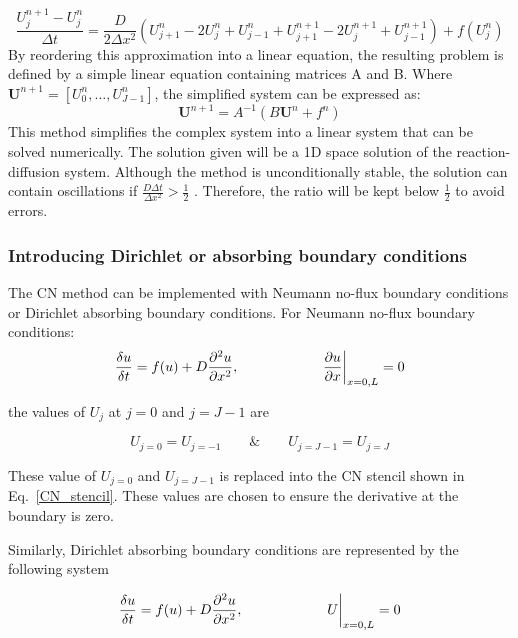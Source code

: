 \begin{equation}
    \frac{U^{n+1}_{j} - U^{n}_{j}}{\Delta t} = \frac{D}{2\Delta x^{2}}\left( U^{n}_{j+1} -  2U^{n}_{j} + U^{n}_{j-1} + U^{n+1}_{j+1} - 2U^{n+1}_{j} + U^{n+1}_{j-1}\right) +  f( U^{n}_{j})
    \label{CN_stencil}
\end{equation}
By reordering this approximation into a linear equation, the resulting problem is defined by a simple linear equation containing matrices A and B. Where $\textbf{U}^{n+1} = [U^{n}_{0}, \ldots , U^{n}_{J-1}]$, the simplified system can be expressed as:
\begin{equation}
    \textbf{U}^{n+1} = A^{-1}(B\textbf{U}^{n} + f^{n})
\end{equation}
This method simplifies the complex system into a linear system that can be solved numerically. The solution given will be a 1D space solution of the reaction-diffusion system. Although the method is unconditionally stable, the solution can contain oscillations if $ \frac{D\Delta t}{\Delta x^{2}} >\frac{1}{2} $ \parencite{trefethen1996finite}. Therefore, the ratio will be kept below $\frac{1}{2}$ to avoid errors.

\subsubsection{Introducing Dirichlet or absorbing boundary conditions}\label{methods_boundary_conditions_CN}
The CN method can be implemented with Neumann no-flux boundary conditions or Dirichlet absorbing boundary conditions.
For Neumann no-flux boundary conditions:
\begin{equation}
    \frac{\delta u}{\delta t} =  f(u) + D\frac{\partial^{2} {u}}{\partial {x}^{2}},   \quad \quad \quad \quad \quad \quad \pdv{u}{x}\biggr\rvert_{x=0,L}=0
\end{equation}

the values of $U_{j}$ at $j=0$ and $j=J-1$ are

\begin{equation}
    U_{j=0} = U_{j=-1}  \quad \quad \&  \quad \quad  U_{j=J-1} = U_{j=J}
\end{equation}

These value of $U_{j=0}$ and  $U_{j=J-1}$ is replaced into the CN stencil shown in Eq.~\ref{CN_stencil}.
These values are chosen to ensure the derivative at the boundary is zero.

Similarly, Dirichlet absorbing boundary conditions are represented by the following system

\begin{equation}
    \frac{\delta u}{\delta t} =  f(u) + D\frac{\partial^{2} {u}}{\partial {x}^{2}},   \quad \quad \quad \quad \quad \quad U\biggr\rvert_{x=0,L}=0
\end{equation}


